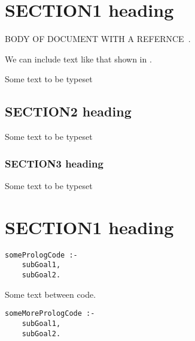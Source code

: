 \documentclass[twocolumn,global]{svjour}
\begin{document}
 


\section{ SECTION1 heading}

BODY OF DOCUMENT WITH A REFERNCE~\cite{swiprolog}.


We can include text like that shown in .

 Some text to be typeset

\subsection{ SECTION2 heading}
 Some text to be typeset

\subsubsection{ SECTION3 heading}
 Some text to be typeset

\section{ SECTION1 heading }\begin{Verbatim}
somePrologCode :-
    subGoal1,
    subGoal2.
\end{Verbatim}
 Some text between code.

\begin{Verbatim}
someMorePrologCode :-
    subGoal1,
    subGoal2.
\end{Verbatim}

\theend
\end{document}
